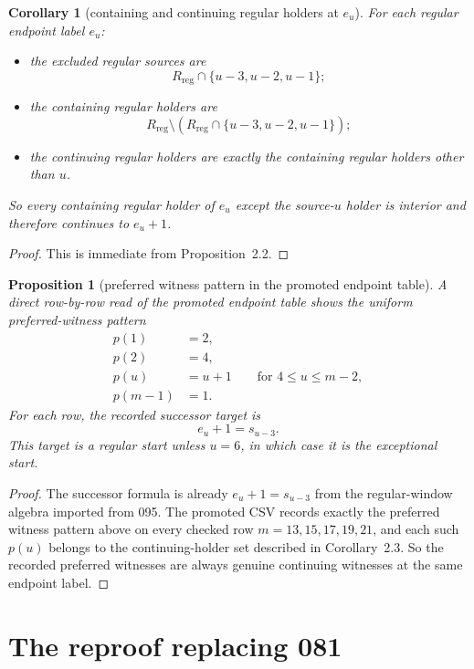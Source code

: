 \documentclass[11pt]{article}
\newtheorem{proposition}[theorem]{Proposition}
\newtheorem{corollary}[theorem]{Corollary}
\newcommand{\Rreg}{R_{\mathrm{reg}}}
\begin{document}
\begin{corollary}[containing and continuing regular holders at $e_u$]
For each regular endpoint label $e_u$:
\begin{itemize}[leftmargin=2em]
\item the excluded regular sources are
      \[
      \Rreg \cap \{u-3,u-2,u-1\};
      \]
\item the containing regular holders are
      \[
      \Rreg \setminus (\Rreg \cap \{u-3,u-2,u-1\});
      \]
\item the continuing regular holders are exactly the containing regular holders
      other than $u$.
\end{itemize}
So every containing regular holder of $e_u$ except the source-$u$ holder is
interior and therefore continues to $e_u+1$.
\end{corollary}

\begin{proof}
This is immediate from Proposition~2.2.
\end{proof}

\begin{proposition}[preferred witness pattern in the promoted endpoint table]
A direct row-by-row read of the promoted endpoint table shows the uniform
preferred-witness pattern
\begin{align*}
p(1) &= 2,\\
p(2) &= 4,\\
p(u) &= u+1 \qquad \text{for } 4 \le u \le m-2,\\
p(m-1) &= 1.
\end{align*}
For each row, the recorded successor target is
\[
e_u + 1 = s_{u-3}.
\]
This target is a regular start unless $u=6$, in which case it is the
exceptional start.
\end{proposition}

\begin{proof}
The successor formula is already $e_u+1=s_{u-3}$ from the regular-window
algebra imported from 095. The promoted CSV records exactly the preferred
witness pattern above on every checked row $m=13,15,17,19,21$, and each such
$p(u)$ belongs to the continuing-holder set described in Corollary~2.3. So the
recorded preferred witnesses are always genuine continuing witnesses at the
same endpoint label.
\end{proof}

\section{The reproof replacing 081}
\end{document}
